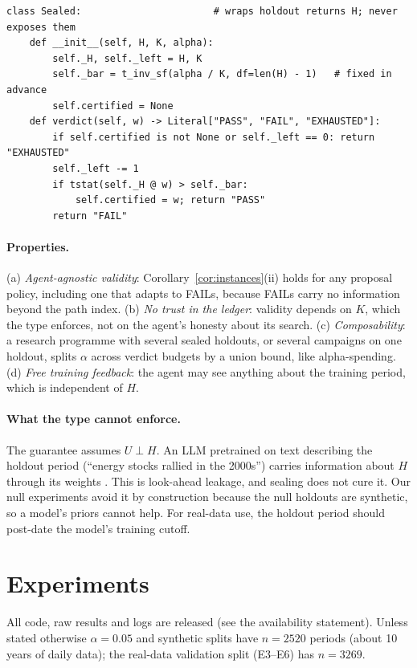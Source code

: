 \documentclass[11pt]{article}
\theoremstyle{definition}
\theoremstyle{remark}
\begin{document}
\begin{lstlisting}
class Sealed:                       # wraps holdout returns H; never exposes them
    def __init__(self, H, K, alpha):
        self._H, self._left = H, K
        self._bar = t_inv_sf(alpha / K, df=len(H) - 1)   # fixed in advance
        self.certified = None
    def verdict(self, w) -> Literal["PASS", "FAIL", "EXHAUSTED"]:
        if self.certified is not None or self._left == 0: return "EXHAUSTED"
        self._left -= 1
        if tstat(self._H @ w) > self._bar:
            self.certified = w; return "PASS"
        return "FAIL"
\end{lstlisting}

\paragraph{Properties.} (a) \emph{Agent-agnostic validity}: Corollary~\ref{cor:instances}(ii) holds for any proposal policy, including one that adapts to FAILs, because FAILs carry no information beyond the path index. (b) \emph{No trust in the ledger}: validity depends on $K$, which the type enforces, not on the agent's honesty about its search. (c) \emph{Composability}: a research programme with several sealed holdouts, or several campaigns on one holdout, splits $\alpha$ across verdict budgets by a union bound, like alpha-spending. (d) \emph{Free training feedback}: the agent may see anything about the training period, which is independent of $H$.

\paragraph{What the type cannot enforce.} The guarantee assumes $U\perp H$. An LLM pretrained on text describing the holdout period (``energy stocks rallied in the 2000s'') carries information about $H$ through its weights \citep{gencay2026honest}. This is look-ahead leakage, and sealing does not cure it. Our null experiments avoid it by construction because the null holdouts are synthetic, so a model's priors cannot help. For real-data use, the holdout period should post-date the model's training cutoff.

\section{Experiments}\label{sec:exp}
All code, raw results and logs are released (see the availability statement). Unless stated otherwise $\alpha=0.05$ and synthetic splits have $n=2520$ periods (about 10 years of daily data); the real-data validation split (E3--E6) has $n=3269$.
\end{document}
